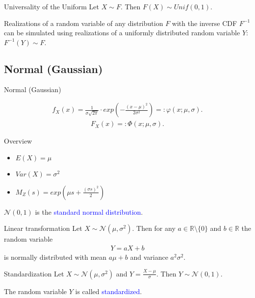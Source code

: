 \documentclass{beamer}
\def\padding{\vspace{0.5cm}}
\def\spadding{\vspace{0.25cm}}
\def\b{\textcolor{blue}}
\begin{document}
\begin{frame}
    \begin{block}{Universality of the Uniform}
        Let $X \sim F$. Then $F(X) \sim Unif(0,1)$.\pause\par\spadding
        Realizations of a random variable of any distribution $F$ with the inverse CDF $F^{-1}$ can be simulated using realizations of a uniformly distributed random variable $Y$: $F^{-1}(Y) \sim F$.
    \end{block}
\end{frame}

\subsection{Normal (Gaussian)}
\begin{frame}{Normal (Gaussian)}
    \begin{definition}
        \begin{align*}
            f_X(x) = \frac{1}{\sigma \sqrt{2 \pi}} \cdot exp\left(-\frac{(x - \mu)^2}{2 \sigma^2}\right) =: \varphi(x;\mu,\sigma).
        \end{align*}
        \begin{align*}
            F_X(x) =: \Phi(x;\mu,\sigma).
        \end{align*}\pause
        \begin{exampleblock}{Overview}
            \begin{itemize}
                \item $E(X) = \mu$\pause
                \item $Var(X) = \sigma^2$\pause
                \item $M_Z(s) = exp(\mu s + \frac{(\sigma s)^2}{2})$
            \end{itemize}
        \end{exampleblock}
    \end{definition}
\end{frame}

\begin{frame}
    $\mathcal{N}(0,1)$ is the \b{standard normal distribution}.\pause\par\padding
    \begin{block}{Linear transformation}
        Let $X \sim \mathcal{N}(\mu, \sigma^2)$. Then for any $a \in \mathbb{R} \setminus \{0\}$ and $b \in \mathbb{R}$ the random variable
        \begin{align*}
            Y = a X + b
        \end{align*}
        is normally distributed with mean $a \mu + b$ and variance $a^2 \sigma^2$.
    \end{block}\pause\par\padding
    \begin{block}{Standardization}
        Let $X \sim \mathcal{N}(\mu, \sigma^2)$ and $Y = \frac{X - \mu}{\sigma}$. Then $Y \sim \mathcal{N}(0,1)$.\pause\par
        The random variable $Y$ is called \b{standardized}.
    \end{block}
\end{frame}
\end{document}
